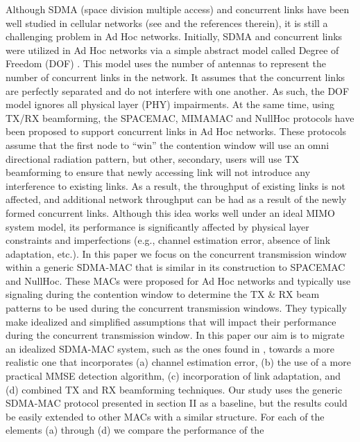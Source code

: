 \documentclass[journal, final]{IEEEtran}
\begin{document}
Although SDMA (space division multiple access) and concurrent links have been well studied in cellular
networks (see \cite{VT_SDMA} and the references therein), it is still a challenging
problem in Ad Hoc networks. Initially, SDMA and concurrent links were
utilized in Ad Hoc networks via a simple abstract model called Degree of
Freedom (DOF) \cite{6_Wireless_Comm_David, COOP_MAC}. This model uses the number
of antennas to represent the number of concurrent links in the network. It
assumes that the concurrent links are perfectly separated and do not
interfere with one another. As such, the DOF model ignores all physical
layer (PHY) impairments. At the same time, using TX/RX beamforming, the
SPACEMAC, MIMAMAC and NullHoc protocols \cite{1_SPACEMAC, 2_MIMOMAN, 3_NULLHOC, 4_nullhoc, 5_MIMA_MAC} have been proposed to
support concurrent links in Ad Hoc networks. These protocols assume that the
first node to ``win'' the contention window will use an omni directional
radiation pattern, but other, secondary, users will use TX beamforming to
ensure that newly accessing link will not introduce any interference to
existing links. As a result, the throughput of existing links is not
affected, and additional network throughput can be had as a result of the
newly formed concurrent links. Although this idea works well under an ideal
MIMO system model, its performance is significantly affected by physical
layer constraints and imperfections (e.g., channel estimation error, absence
of link adaptation, etc.). In this paper we focus on the concurrent
transmission window within a generic SDMA-MAC that is similar in its
construction to SPACEMAC and NullHoc. These MACs were proposed for Ad Hoc
networks and typically use signaling during the contention window to
determine the TX {\&} RX beam patterns to be used during the concurrent
transmission windows. They typically make idealized and simplified
assumptions that will impact their performance during the concurrent
transmission window. In this paper our aim is to migrate an idealized
SDMA-MAC system, such as the ones found in \cite{1_SPACEMAC, 2_MIMOMAN, 3_NULLHOC, 4_nullhoc}, towards a more realistic
one that incorporates (a) channel estimation error, (b) the use of a more
practical MMSE detection algorithm, (c) incorporation of link adaptation,
and (d) combined TX and RX beamforming techniques. Our study uses the
generic SDMA-MAC protocol presented in section II as a baseline, but the
results could be easily extended to other MACs with a similar structure. For
each of the elements (a) through (d) we compare the performance of the
\end{document}
